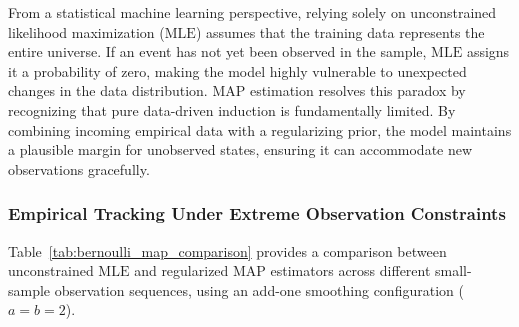 \documentclass{article}
\begin{document}
From a statistical machine learning perspective, relying solely on unconstrained likelihood maximization ($\text{MLE}$) assumes that the training data represents the entire universe. If an event has not yet been observed in the sample, $\text{MLE}$ assigns it a probability of zero, making the model highly vulnerable to unexpected changes in the data distribution. $\text{MAP}$ estimation resolves this paradox by recognizing that pure data-driven induction is fundamentally limited. By combining incoming empirical data with a regularizing prior, the model maintains a plausible margin for unobserved states, ensuring it can accommodate new observations gracefully.

\subsubsection{Empirical Tracking Under Extreme Observation Constraints}

Table~\ref{tab:bernoulli_map_comparison} provides a comparison between unconstrained $\text{MLE}$ and regularized $\text{MAP}$ estimators across different small-sample observation sequences, using an add-one smoothing configuration ($a=b=2$).

\begin{table}[htbp]
\centering
\small
{}
\caption{Behavior of Bernoulli Parameter Estimators Under Asymmetric Small-Sample Observations}
\label{tab:bernoulli_map_comparison}
\end{table}
\end{document}
